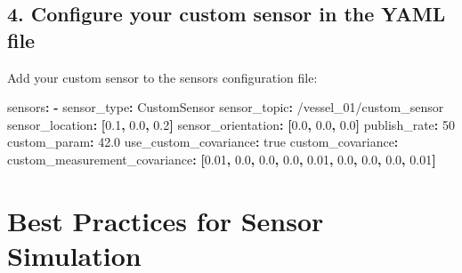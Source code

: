\documentclass[
  letterpaper,
  DIV=11,
  numbers=noendperiod]{scrreprt}
\newenvironment{Shaded}{\begin{snugshade}}{\end{snugshade}}
\newcommand{\AttributeTok}[1]{\textcolor[rgb]{0.40,0.45,0.13}{#1}}
\newcommand{\CharTok}[1]{\textcolor[rgb]{0.13,0.47,0.30}{#1}}
\newcommand{\DecValTok}[1]{\textcolor[rgb]{0.68,0.00,0.00}{#1}}
\newcommand{\FloatTok}[1]{\textcolor[rgb]{0.68,0.00,0.00}{#1}}
\newcommand{\FunctionTok}[1]{\textcolor[rgb]{0.28,0.35,0.67}{#1}}
\newcommand{\KeywordTok}[1]{\textcolor[rgb]{0.00,0.23,0.31}{\textbf{#1}}}
\begin{document}
\subsection*{4. Configure your custom sensor in the YAML
file}\label{configure-your-custom-sensor-in-the-yaml-file}

Add your custom sensor to the sensors configuration file:

\begin{Shaded}
\begin{Highlighting}[]
\FunctionTok{sensors}\KeywordTok{:}
\AttributeTok{  }\KeywordTok{{-}}\AttributeTok{ }
\AttributeTok{    }\FunctionTok{sensor\_type}\KeywordTok{:}\AttributeTok{ CustomSensor}
\AttributeTok{    }\FunctionTok{sensor\_topic}\KeywordTok{:}\AttributeTok{ /vessel\_01/custom\_sensor}
\AttributeTok{    }\FunctionTok{sensor\_location}\KeywordTok{:}\AttributeTok{ }\KeywordTok{[}\FloatTok{0.1}\KeywordTok{,}\AttributeTok{ }\FloatTok{0.0}\KeywordTok{,}\AttributeTok{ }\FloatTok{0.2}\KeywordTok{]}
\AttributeTok{    }\FunctionTok{sensor\_orientation}\KeywordTok{:}\AttributeTok{ }\KeywordTok{[}\FloatTok{0.0}\KeywordTok{,}\AttributeTok{ }\FloatTok{0.0}\KeywordTok{,}\AttributeTok{ }\FloatTok{0.0}\KeywordTok{]}
\AttributeTok{    }\FunctionTok{publish\_rate}\KeywordTok{:}\AttributeTok{ }\DecValTok{50}
\AttributeTok{    }\FunctionTok{custom\_param}\KeywordTok{:}\AttributeTok{ }\FloatTok{42.0}
\AttributeTok{    }\FunctionTok{use\_custom\_covariance}\KeywordTok{:}\AttributeTok{ }\CharTok{true}
\AttributeTok{    }\FunctionTok{custom\_covariance}\KeywordTok{:}
\AttributeTok{      }\FunctionTok{custom\_measurement\_covariance}\KeywordTok{:}\AttributeTok{ }\KeywordTok{[}\FloatTok{0.01}\KeywordTok{,}\AttributeTok{ }\FloatTok{0.0}\KeywordTok{,}\AttributeTok{ }\FloatTok{0.0}\KeywordTok{,}\AttributeTok{ }\FloatTok{0.0}\KeywordTok{,}\AttributeTok{ }\FloatTok{0.01}\KeywordTok{,}\AttributeTok{ }\FloatTok{0.0}\KeywordTok{,}\AttributeTok{ }\FloatTok{0.0}\KeywordTok{,}\AttributeTok{ }\FloatTok{0.0}\KeywordTok{,}\AttributeTok{ }\FloatTok{0.01}\KeywordTok{]}
\end{Highlighting}
\end{Shaded}

\section*{Best Practices for Sensor
Simulation}\label{best-practices-for-sensor-simulation}
\end{document}
